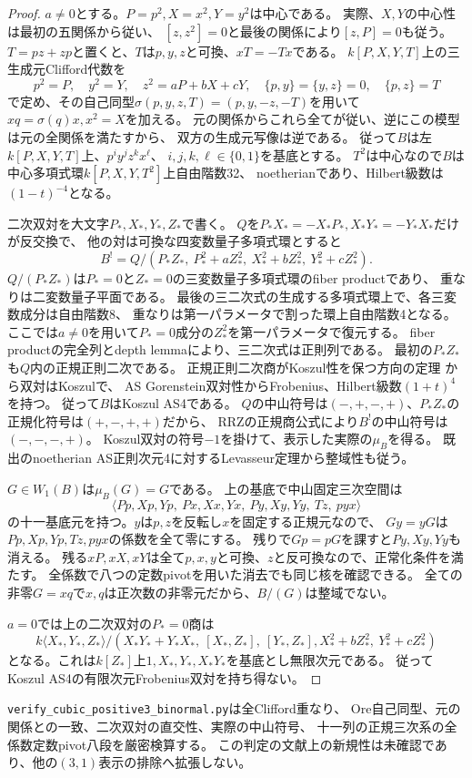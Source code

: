 \begin{proof}
$a\ne0$とする。$P=p^2,X=x^2,Y=y^2$は中心である。
実際、$X,Y$の中心性は最初の五関係から従い、
$[z,z^2]=0$と最後の関係により$[z,P]=0$も従う。
$T=pz+zp$と置くと、$T$は$p,y,z$と可換、$xT=-Tx$である。
$k[P,X,Y,T]$上の三生成元Clifford代数を
\[
 p^2=P,\quad y^2=Y,\quad z^2=aP+bX+cY,\quad
 \{p,y\}=\{y,z\}=0,\quad\{p,z\}=T
\]
で定め、その自己同型$\sigma(p,y,z,T)=(p,y,-z,-T)$を用いて
$xq=\sigma(q)x,x^2=X$を加える。
元の関係からこれら全てが従い、逆にこの模型は元の全関係を満たすから、
双方の生成元写像は逆である。
従って$B$は左$k[P,X,Y,T]$上、$p^iy^jz^kx^\ell$、
$i,j,k,\ell\in\{0,1\}$を基底とする。
$T^2$は中心なので$B$は中心多項式環$k[P,X,Y,T^2]$上自由階数32、
noetherianであり、Hilbert級数は$(1-t)^{-4}$となる。

二次双対を大文字$P_*,X_*,Y_*,Z_*$で書く。
$Q$を$P_*X_*=-X_*P_*,X_*Y_*=-Y_*X_*$だけが反交換で、
他の対は可換な四変数量子多項式環とすると
\[
 B^!=Q/(P_*Z_*,\ P_*^2+aZ_*^2,\ X_*^2+bZ_*^2,\ Y_*^2+cZ_*^2).
\]
$Q/(P_*Z_*)$は$P_*=0$と$Z_*=0$の三変数量子多項式環のfiber productであり、
重なりは二変数量子平面である。
最後の三二次式の生成する多項式環上で、各三変数成分は自由階数8、
重なりは第一パラメータで割った環上自由階数4となる。
ここでは$a\ne0$を用いて$P_*=0$成分の$Z_*^2$を第一パラメータで復元する。
fiber productの完全列とdepth lemmaにより、三二次式は正則列である。
最初の$P_*Z_*$も$Q$内の正規正則二次である。
正規正則二次商がKoszul性を保つ方向の定理
\cite[Chapter 2, Corollary 6.3]{PolishchukPositselski}から双対はKoszulで、
AS Gorenstein双対性からFrobenius、Hilbert級数$(1+t)^4$を持つ。
従って$B$はKoszul AS4である。
$Q$の中山符号は$(-,+,-,+)$、$P_*Z_*$の正規化符号は$(+,-,+,+)$だから、
RRZの正規商公式により$B^!$の中山符号は$(-,-,-,+)$。
Koszul双対の符号$-1$を掛けて、表示した実際の$\mu_B$を得る。
既出のnoetherian AS正則次元4に対するLevasseur定理から整域性も従う。

$G\in W_1(B)$は$\mu_B(G)=G$である。
上の基底で中山固定三次空間は
\[
 \langle Pp,Xp,Yp,\ Px,Xx,Yx,\ Py,Xy,Yy,\ Tz,\ pyx\rangle
\]
の十一基底元を持つ。$y$は$p,z$を反転し$x$を固定する正規元なので、
$Gy=yG$は$Pp,Xp,Yp,Tz,pyx$の係数を全て零にする。
残りで$Gp=pG$を課すと$Py,Xy,Yy$も消える。
残る$xP,xX,xY$は全て$p,x,y$と可換、$z$と反可換なので、正常化条件を満たす。
全係数で八つの定数pivotを用いた消去でも同じ核を確認できる。
全ての非零$G=xq$で$x,q$は正次数の非零元だから、$B/(G)$は整域でない。

$a=0$では上の二次双対の$P_*=0$商は
\[
 k\langle X_*,Y_*,Z_*\rangle/
 (X_*Y_*+Y_*X_*,\ [X_*,Z_*],\ [Y_*,Z_*],
 X_*^2+bZ_*^2,\ Y_*^2+cZ_*^2)
\]
となる。これは$k[Z_*]$上$1,X_*,Y_*,X_*Y_*$を基底とし無限次元である。
従ってKoszul AS4の有限次元Frobenius双対を持ち得ない。
\end{proof}

\texttt{verify\_cubic\_positive3\_binormal.py}は全Clifford重なり、
Ore自己同型、元の関係との一致、二次双対の直交性、実際の中山符号、
十一列の正規三次系の全係数定数pivot八段を厳密検算する。
この判定の文献上の新規性は未確認であり、他の$(3,1)$表示の排除へ拡張しない。
